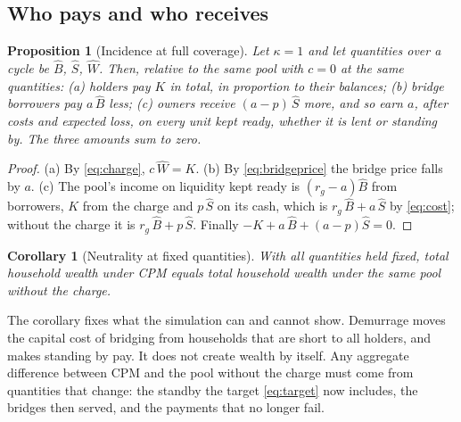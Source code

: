 \documentclass[10pt,a4paper]{article}
\newtheorem{proposition}{Proposition}
\newtheorem{corollary}{Corollary}
\theoremstyle{remark}
\newcommand{\cyc}[1]{\widehat{#1}}
\begin{document}
\subsection{Who pays and who receives}
\begin{proposition}[Incidence at full coverage]
\label{prop:incidence}
Let \(\kappa=1\) and let quantities over a cycle be \(\cyc B\), \(\cyc S\),
\(\cyc W\). Then, relative to the same pool with \(c=0\) at the same
quantities:
(a) holders pay \(K\) in total, in proportion to their balances;
(b) bridge borrowers pay \(a\,\cyc B\) less;
(c) owners receive \((a-p)\,\cyc S\) more, and so earn \(a\), after costs and
expected loss, on every unit kept ready, whether it is lent or standing by.
The three amounts sum to zero.
\end{proposition}
\begin{proof}
(a) By \eqref{eq:charge}, \(c\,\cyc W=K\). (b) By \eqref{eq:bridgeprice} the
bridge price falls by \(a\). (c) The pool's income on liquidity kept ready is
\((r_g-a)\cyc B\) from borrowers, \(K\) from the charge and \(p\,\cyc S\) on
its cash, which is \(r_g\,\cyc B+a\,\cyc S\) by \eqref{eq:cost}; without the
charge it is \(r_g\,\cyc B+p\,\cyc S\). Finally
\(-K+a\,\cyc B+(a-p)\cyc S=0\).
\end{proof}
\begin{corollary}[Neutrality at fixed quantities]
\label{cor:neutral}
With all quantities held fixed, total household wealth under CPM equals total
household wealth under the same pool without the charge.
\end{corollary}
The corollary fixes what the simulation can and cannot show. Demurrage moves
the capital cost of bridging from households that are short to all
holders, and makes standing by pay. It does not create wealth by itself.
Any aggregate difference between CPM and the pool without the charge must
come from quantities that change: the standby the target
\eqref{eq:target} now includes, the bridges then served, and the
payments that no longer fail.
\end{document}
